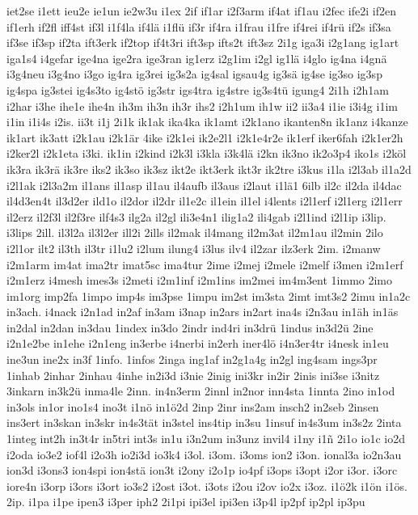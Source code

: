 {iet2se
i1ett
ieu2e
ie1un
ie2w3u
i1ex
2if
if1ar
i2f3arm
if4at
if1au
i2fec
ife2i
if2en
if1erh
if2fl
iff4st
if3l
i1f4la
if4lä
i1flü
if3r
if4ra
i1frau
i1fre
if4rei
if4rü
if2s
if3sa
if3se
if3sp
if2ta
ift3erk
if2top
if4t3ri
ift3sp
ifts2t
ift3sz
2i1g
iga3i
i2g1ang
ig1art
iga1s4
i4gefar
ige4na
ige2ra
ige3ran
ig1erz
i2g1im
i2gl
ig1lä
i4glo
ig4na
i4gnä
i3g4neu
i3g4no
i3go
ig4ra
ig3rei
ig3s2a
ig4sal
igsau4g
ig3sä
ig4se
ig3so
ig3sp
ig4spa
ig3stei
ig4s3to
ig4stö
ig3str
igs4tra
ig4stre
ig3s4tü
igung4
2i1h
i2h1am
i2har
i3he
ihe1e
ihe4n
ih3m
ih3n
ih3r
ihs2
i2h1um
ih1w
ii2
ii3a4
i1ie
i3i4g
i1im
i1in
i1i4s
i2is.
ii3t
i1j
2i1k
ik1ak
ika4ka
ik1amt
i2k1ano
ikanten8n
ik1anz
i4kanze
ik1art
ik3att
i2k1au
i2k1är
4ike
i2k1ei
ik2e2l1
i2k1e4r2e
ik1erf
iker6fah
i2k1er2h
i2ker2l
i2k1eta
i3ki.
ik1in
i2kind
i2k3l
i3kla
i3k4lä
i2kn
ik3no
ik2o3p4
iko1s
i2köl
ik3ra
ik3rä
ik3re
iks2
ik3so
ik3sz
ikt2e
ikt3erk
ikt3r
ik2tre
i3kus
i1la
i2l3ab
il1a2d
i2l1ak
i2l3a2m
il1ans
il1asp
il1au
il4aufb
il3aus
i2laut
i1lä1
6ilb
il2c
il2da
il4dac
il4d3en4t
il3d2er
ild1o
il2dor
il2dr
il1e2c
il1ein
il1el
i4lents
i2l1erf
i2l1erg
i2l1err
il2erz
il2f3l
il2f3re
ilf4s3
ilg2a
il2gl
ili3e4n1
ilig1a2
ili4gab
i2l1ind
i2l1ip
i3lip.
i3lips
2ill.
il3l2a
il3l2er
ill2i
2ills
il2mak
il4mang
il2m3at
il2m1au
il2min
2ilo
i2l1or
ilt2
il3th
il3tr
i1lu2
i2lum
ilung4
i3lus
ilv4
il2zar
ilz3erk
2im.
i2manw
i2m1arm
im4at
ima2tr
imat5sc
ima4tur
2ime
i2mej
i2mele
i2melf
i3men
i2m1erf
i2m1erz
i4mesh
imes3s
i2meti
i2m1inf
i2m1ins
im2mei
im4m3ent
1immo
2imo
im1org
imp2fa
1impo
imp4s
im3pse
1impu
im2st
im3sta
2imt
imt3s2
2imu
in1a2c
in3ach.
i4nack
i2n1ad
in2af
in3am
i3nap
in2ars
in2art
ina4s
i2n3au
in1äh
in1äs
in2dal
in2dan
in3dau
1index
in3do
2indr
ind4ri
in3drü
1indus
in3d2ü
2ine
i2n1e2be
in1ehe
i2n1eng
in3erbe
i4nerbi
in2erh
iner4lö
i4n3er4tr
i4nesk
in1eu
ine3un
ine2x
in3f
1info.
1infos
2inga
ing1af
in2g1a4g
in2gl
ing4sam
ings3pr
1inhab
2inhar
2inhau
4inhe
in2i3d
i3nie
2inig
ini3kr
in2ir
2inis
ini3se
i3nitz
3inkarn
in3k2ü
inma4le
2inn.
in4n3erm
2innl
in2nor
inn4sta
1innta
2ino
in1od
in3ols
in1or
ino1s4
ino3t
i1nö
in1ö2d
2inp
2inr
ins2am
insch2
in2seb
2insen
ins3ert
in3skan
in3skr
in4s3tät
in3stel
ins4tip
in3su
1insuf
in4s3um
in3s2z
2inta
1integ
int2h
in3t4r
in5tri
int3s
in1u
i3n2um
in3unz
invil4
i1ny
i1ñ
2i1o
io1c
io2d
i2oda
io3e2
iof4l
i2o3h
io2i3d
io3k4
i3ol.
i3om.
i3oms
ion2
i3on.
ional3a
io2n3au
ion3d
i3ons3
ion4spi
ion4stä
ion3t
i2ony
i2o1p
io4pf
i3ops
i3opt
i2or
i3or.
i3orc
iore4n
i3orp
i3ors
i3ort
io3s2
i2ost
i3ot.
i3ots
i2ou
i2ov
io2x
i3oz.
i1ö2k
i1ön
i1ös.
2ip.
i1pa
i1pe
ipen3
i3per
iph2
2i1pi
ipi3el
ipi3en
i3p4l
ip2pf
ip2pl
ip3pu
}
